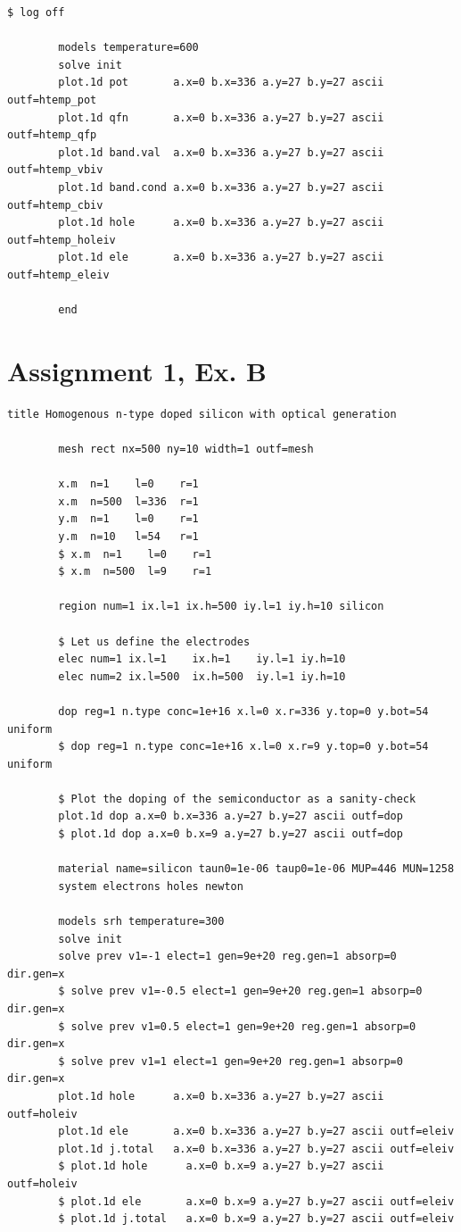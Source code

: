 \documentclass{book}
\begin{document}
\begin{Verbatim}[gobble=4]
        $ log off

        models temperature=600
        solve init
        plot.1d pot       a.x=0 b.x=336 a.y=27 b.y=27 ascii outf=htemp_pot
        plot.1d qfn       a.x=0 b.x=336 a.y=27 b.y=27 ascii outf=htemp_qfp
        plot.1d band.val  a.x=0 b.x=336 a.y=27 b.y=27 ascii outf=htemp_vbiv
        plot.1d band.cond a.x=0 b.x=336 a.y=27 b.y=27 ascii outf=htemp_cbiv
        plot.1d hole      a.x=0 b.x=336 a.y=27 b.y=27 ascii outf=htemp_holeiv
        plot.1d ele       a.x=0 b.x=336 a.y=27 b.y=27 ascii outf=htemp_eleiv

        end
        \end{Verbatim}

        \newpage
        \section*{Assignment 1, Ex. B}
        \begin{Verbatim}[gobble=4]
        title Homogenous n-type doped silicon with optical generation

        mesh rect nx=500 ny=10 width=1 outf=mesh

        x.m  n=1    l=0    r=1
        x.m  n=500  l=336  r=1
        y.m  n=1    l=0    r=1
        y.m  n=10   l=54   r=1
        $ x.m  n=1    l=0    r=1
        $ x.m  n=500  l=9    r=1

        region num=1 ix.l=1 ix.h=500 iy.l=1 iy.h=10 silicon

        $ Let us define the electrodes
        elec num=1 ix.l=1    ix.h=1    iy.l=1 iy.h=10
        elec num=2 ix.l=500  ix.h=500  iy.l=1 iy.h=10

        dop reg=1 n.type conc=1e+16 x.l=0 x.r=336 y.top=0 y.bot=54 uniform
        $ dop reg=1 n.type conc=1e+16 x.l=0 x.r=9 y.top=0 y.bot=54 uniform

        $ Plot the doping of the semiconductor as a sanity-check
        plot.1d dop a.x=0 b.x=336 a.y=27 b.y=27 ascii outf=dop
        $ plot.1d dop a.x=0 b.x=9 a.y=27 b.y=27 ascii outf=dop

        material name=silicon taun0=1e-06 taup0=1e-06 MUP=446 MUN=1258
        system electrons holes newton

        models srh temperature=300 
        solve init
        solve prev v1=-1 elect=1 gen=9e+20 reg.gen=1 absorp=0 dir.gen=x
        $ solve prev v1=-0.5 elect=1 gen=9e+20 reg.gen=1 absorp=0 dir.gen=x
        $ solve prev v1=0.5 elect=1 gen=9e+20 reg.gen=1 absorp=0 dir.gen=x
        $ solve prev v1=1 elect=1 gen=9e+20 reg.gen=1 absorp=0 dir.gen=x
        plot.1d hole      a.x=0 b.x=336 a.y=27 b.y=27 ascii outf=holeiv
        plot.1d ele       a.x=0 b.x=336 a.y=27 b.y=27 ascii outf=eleiv
        plot.1d j.total   a.x=0 b.x=336 a.y=27 b.y=27 ascii outf=eleiv 
        $ plot.1d hole      a.x=0 b.x=9 a.y=27 b.y=27 ascii outf=holeiv
        $ plot.1d ele       a.x=0 b.x=9 a.y=27 b.y=27 ascii outf=eleiv
        $ plot.1d j.total   a.x=0 b.x=9 a.y=27 b.y=27 ascii outf=eleiv 
        \end{Verbatim}
\end{document}

